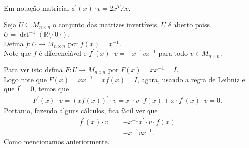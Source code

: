 Em notação matricial $\phi^{\prime}(x)\cdot v=2 x^{T}Av$.
\begin{example}
  Seja $U\subseteq M_{n\times n}$ o conjunto das matrizes invertíveis. $U$ é aberto poiss $U=\det^{-1}(\mathbb{R}\setminus\{0\})$.\\
  Defina $f:U\to M_{n\times n}$ por $f(x)=x^{-1}$.\\
  Note que $f$ é diferenciável e $f^{\prime}(x)\cdot v=-x^{-1}vx^{-1}$ para todo $v\in M_{n\times n}$. 
\end{example}
Para ver isto defina $F:U\to M_{n\times n}$ por $F(x)=xx^{-1}=I$.\\
Logo note que $F(x)=xx^{-1}=xf(x)=I$, agora, usando a regra de Leibniz e que $I^{\prime}=0$, temos que
\begin{align*}
  F^{\prime}(x)\cdot v=\left( xf(x) \right)^{\prime}\cdot v=x^{\prime}\cdot v\cdot f(x)+x\cdot f^{\prime}(x)\cdot v=0.
\end{align*}
Portanto, fazendo alguns cálculos, fica fácil ver que
\begin{align*}
  f^{\prime}(x)\cdot v&=-x^{-1}x^{\prime}\cdot v\cdot f(x)\\
  &=-x^{-1}vx^{-1}.
\end{align*}
Como mencionamos anteriormente.
